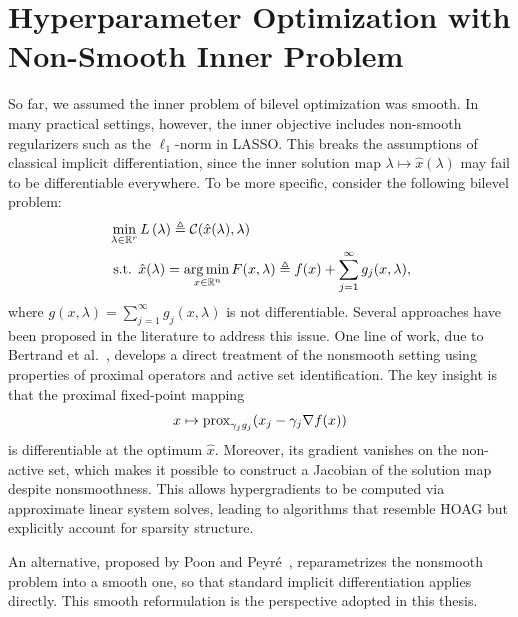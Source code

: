\documentclass[11pt, twoside]{report}
\begin{document}
\section{Hyperparameter Optimization with Non-Smooth Inner Problem}
\label{section-hoag_nonsmooth}
So far, we assumed the inner problem of bilevel optimization was smooth. In many practical settings, however, the inner objective includes non-smooth regularizers such as the $\ell_1$-norm in LASSO. This breaks the assumptions of classical implicit differentiation, since the inner solution map $\lambda \mapsto \hat{x}(\lambda)$ may fail to be differentiable everywhere. To be more specific, consider the following bilevel problem:
\begin{align} 
&\min _{\lambda \in \mathbb{R}^r} L\left(\lambda \right) \triangleq \mathcal{C}(\hat{x}(\lambda),\lambda) \label{bilev_ns1}\\
&\text { s.t. } \hat{x}(\lambda) =\underset{x \in \mathbb{R}^{n}} {\operatorname*{arg\, min \,}} {F(x,\lambda) \triangleq f(x) + \sum_{j=1}^\infty g_j(x,\lambda)} \label{inprob_ns0},
\end{align}
where $g(x,\lambda) = \sum_{j=1}^\infty g_j(x,\lambda)$ is not differentiable. Several approaches have been proposed in the literature to address this issue. One line of work, due to Bertrand et al.~\cite{bertrand2022implicit}, develops a direct treatment of the nonsmooth setting using properties of proximal operators and active set identification. The key insight is that the proximal fixed-point mapping  
\[
x \mapsto \operatorname{prox}_{\gamma_j g_j}(x_j - \gamma_j \nabla f(x))
\]  
is differentiable at the optimum $\hat{x}$. Moreover, its gradient vanishes on the non-active set, which makes it possible to construct a Jacobian of the solution map despite nonsmoothness. This allows hypergradients to be computed via approximate linear system solves, leading to algorithms that resemble HOAG but explicitly account for sparsity structure.  

An alternative, proposed by Poon and Peyré~\cite{poon}, reparametrizes the nonsmooth problem into a smooth one, so that standard implicit differentiation applies directly. This smooth reformulation is the perspective adopted in this thesis.  
\end{document}
